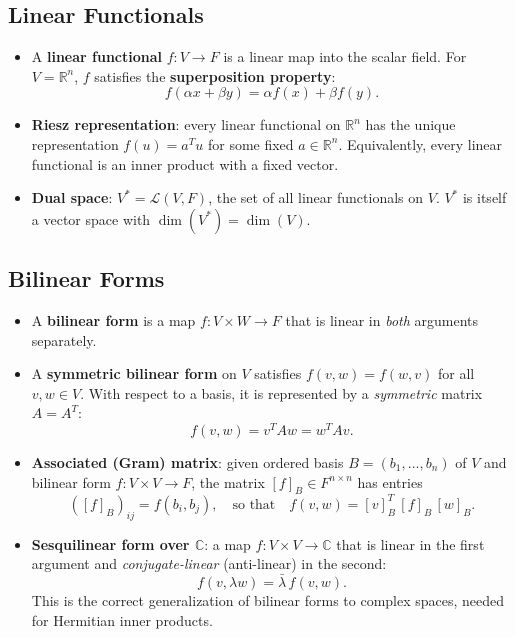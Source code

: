 \documentclass[hidelinks]{article}
\begin{document}
\subsection{Linear Functionals}
\begin{itemize}
    \item A \textbf{linear functional} $f: V \rightarrow F$ is a linear map into the scalar field. For $V = \mathbb{R}^n$, $f$ satisfies the \textbf{superposition property}:
    \[
        f(\alpha x + \beta y) = \alpha f(x) + \beta f(y).
    \]
    \item \textbf{Riesz representation}: every linear functional on $\mathbb{R}^n$ has the unique representation $f(u) = a^T u$ for some fixed $a\in\mathbb{R}^n$.
    Equivalently, every linear functional is an inner product with a fixed vector.
    \item \textbf{Dual space}: $V^* = \mathcal{L}(V, F)$, the set of all linear functionals on $V$. $V^*$ is itself a vector space with $\dim(V^*) = \dim(V)$.
\end{itemize}

\subsection{Bilinear Forms}
\begin{itemize}
    \item A \textbf{bilinear form} is a map $f: V\times W \rightarrow F$ that is linear in \emph{both} arguments separately.
    \item A \textbf{symmetric bilinear form} on $V$ satisfies $f(v,w)=f(w,v)$ for all $v,w\in V$. With respect to a basis, it is represented by a \emph{symmetric} matrix $A = A^T$:
    \[
        f(v,w) = v^T A w = w^T A v.
    \]
    \item \textbf{Associated (Gram) matrix}: given ordered basis $B=(b_1,\ldots,b_n)$ of $V$ and bilinear form $f: V\times V\rightarrow F$, the matrix $[f]_B \in F^{n\times n}$ has entries
    \[
        ([f]_B)_{ij} = f(b_i, b_j),\quad\text{so that}\quad f(v,w) = [v]_B^T\, [f]_B\, [w]_B.
    \]
    \item \textbf{Sesquilinear form over $\mathbb{C}$}: a map $f: V\times V\rightarrow\mathbb{C}$ that is linear in the first argument and \emph{conjugate-linear} (anti-linear) in the second:
    \[
        f(v, \lambda w) = \bar{\lambda}\, f(v, w).
    \]
    This is the correct generalization of bilinear forms to complex spaces, needed for Hermitian inner products.
\end{itemize}
\end{document}
